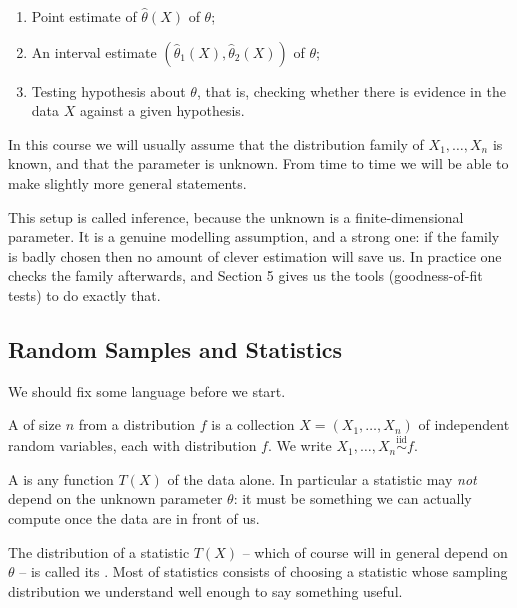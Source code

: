 \documentclass[a4paper]{scrartcl}
\begin{document}
\begin{enumerate}
  \item Point estimate of $\hat{\theta}(X)$ of $\theta$;
  \item An interval estimate $(\hat{\theta}_1(X), \hat{\theta}_2(X))$ of $\theta$;
  \item Testing hypothesis about $\theta$, that is, checking whether there is evidence in the data $X$ against a given hypothesis.
\end{enumerate}

In this course we will usually assume that the distribution family of $X_1, \dots, X_n$ is known, and that the parameter is unknown. From time to time we will be able to make slightly more general statements.

This setup is called  inference, because the unknown is a finite-dimensional parameter. It is a genuine modelling assumption, and a strong one: if the family is badly chosen then no amount of clever estimation will save us. In practice one checks the family afterwards, and Section 5 gives us the tools (goodness-of-fit tests) to do exactly that.

\subsection{Random Samples and Statistics}

We should fix some language before we start.

\begin{definition}
  A  of size $n$ from a distribution $f$ is a collection $X = (X_1, \dots, X_n)$ of independent random variables, each with distribution $f$. We write $X_1, \dots, X_n \stackrel{\text{iid}}{\sim} f$.
\end{definition}

\begin{definition}[Statistic]
  A  is any function $T(X)$ of the data alone. In particular a statistic may \emph{not} depend on the unknown parameter $\theta$: it must be something we can actually compute once the data are in front of us.
\end{definition}

The distribution of a statistic $T(X)$ -- which of course will in general depend on $\theta$ -- is called its . Most of statistics consists of choosing a statistic whose sampling distribution we understand well enough to say something useful.
\end{document}
